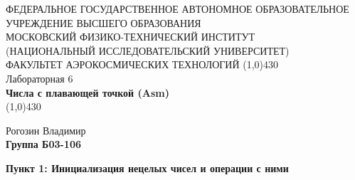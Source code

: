 \documentclass[a4paper,12pt]{article}
\begin{document}
\begin{titlepage}
\begin{center}
\large{\small ФЕДЕРАЛЬНОЕ ГОСУДАРСТВЕННОЕ АВТОНОМНОЕ ОБРАЗОВАТЕЛЬНОЕ\\ УЧРЕЖДЕНИЕ ВЫСШЕГО ОБРАЗОВАНИЯ \\ МОСКОВСКИЙ ФИЗИКО-ТЕХНИЧЕСКИЙ ИНСТИТУТ\\ (НАЦИОНАЛЬНЫЙ ИССЛЕДОВАТЕЛЬСКИЙ УНИВЕРСИТЕТ)\\ ФАКУЛЬТЕТ АЭРОКОСМИЧЕСКИХ ТЕХНОЛОГИЙ}
\vfill
\line(1,0){430}\\[1mm]
\huge{Лабораторная 6}\\
\huge\textbf{Числа с плавающей точкой (Asm)}\\
\line(1,0){430}\\[1mm]
\vfill
\begin{flushright}
\normalsize{Рогозин Владимир}\\
\normalsize{\textbf{Группа Б03-106}}\\
\end{flushright}
\end{center}
\end{titlepage}


\textbf{Пункт 1: Инициализация нецелых чисел и операции с ними}
\end{document}
